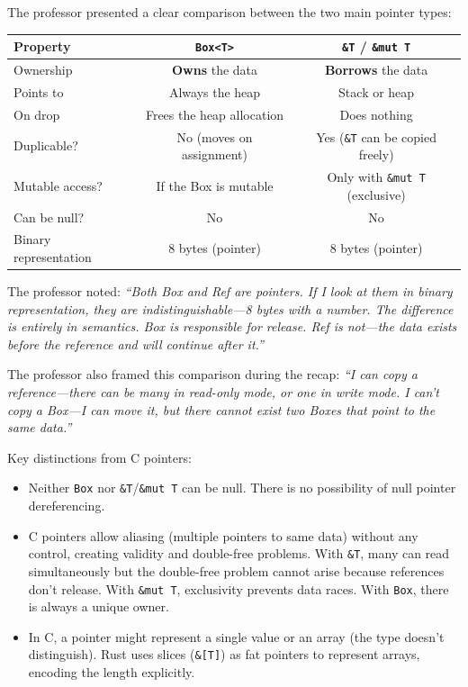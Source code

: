 The professor presented a clear comparison between the two main pointer types:

\begin{center}
\begin{tabular}{|l|c|c|}
\hline
\textbf{Property} & \textbf{\texttt{Box<T>}} & \textbf{\texttt{\&T} / \texttt{\&mut T}} \\
\hline
Ownership & \textbf{Owns} the data & \textbf{Borrows} the data \\
Points to & Always the heap & Stack or heap \\
On drop & Frees the heap allocation & Does nothing \\
Duplicable? & No (moves on assignment) & Yes (\texttt{\&T} can be copied freely) \\
Mutable access? & If the Box is mutable & Only with \texttt{\&mut T} (exclusive) \\
Can be null? & No & No \\
Binary representation & 8 bytes (pointer) & 8 bytes (pointer) \\
\hline
\end{tabular}
\end{center}

The professor noted: \emph{``Both Box and Ref are pointers. If I look at them in binary representation, they are indistinguishable---8 bytes with a number. The difference is entirely in semantics. Box is responsible for release. Ref is not---the data exists before the reference and will continue after it.''}

The professor also framed this comparison during the recap: \emph{``I can copy a reference---there can be many in read-only mode, or one in write mode. I can't copy a Box---I can move it, but there cannot exist two Boxes that point to the same data.''}

Key distinctions from C pointers:
\begin{itemize}
    \item Neither \texttt{Box} nor \texttt{\&T}/\texttt{\&mut T} can be null. There is no possibility of null pointer dereferencing.
    \item C pointers allow aliasing (multiple pointers to same data) without any control, creating validity and double-free problems. With \texttt{\&T}, many can read simultaneously but the double-free problem cannot arise because references don't release. With \texttt{\&mut T}, exclusivity prevents data races. With \texttt{Box}, there is always a unique owner.
    \item In C, a pointer might represent a single value or an array (the type doesn't distinguish). Rust uses slices (\texttt{\&[T]}) as fat pointers to represent arrays, encoding the length explicitly.
\end{itemize}

